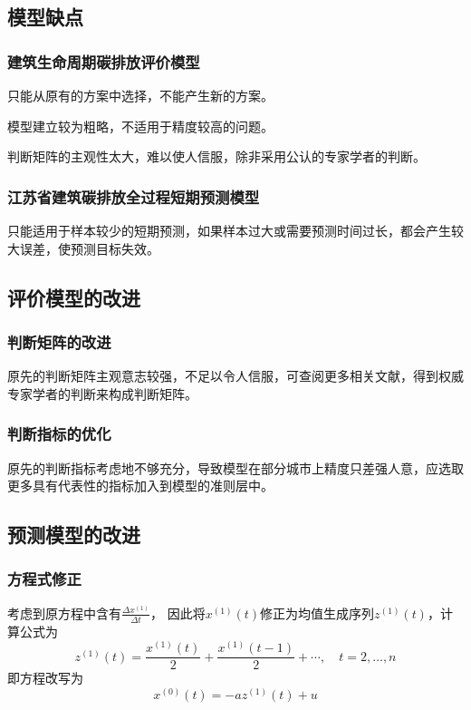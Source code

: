 \documentclass[a4paper, 12pt]{article}
\numberwithin{equation}{section}
\begin{document}
        \subsection{模型缺点}
            \subsubsection{建筑生命周期碳排放评价模型}
                只能从原有的方案中选择，不能产生新的方案。

                模型建立较为粗略，不适用于精度较高的问题。

                判断矩阵的主观性太大，难以使人信服，除非采用公认的专家学者的判断。

            \subsubsection{江苏省建筑碳排放全过程短期预测模型}
                只能适用于样本较少的短期预测，如果样本过大或需要预测时间过长，都会产生较大误差，使预测目标失效。


    {}
        \subsection{评价模型的改进}
            \subsubsection{判断矩阵的改进}
                原先的判断矩阵主观意志较强，不足以令人信服，可查阅更多相关文献，得到权威专家学者的判断来构成判断矩阵。

            \subsubsection{判断指标的优化}
                原先的判断指标考虑地不够充分，导致模型在部分城市上精度只差强人意，应选取更多具有代表性的指标加入到模型的准则层中。


        \subsection{预测模型的改进}
            \subsubsection{方程式修正}
                考虑到原方程中含有$ \frac{\Delta x^{ (1)}}{\Delta t} $，
                因此将$ x^{ (1)} (t) $修正为均值生成序列$ z^{ (1)} (t) $，计算公式为
                \[ z^{ (1)} (t) = \frac{x^{ (1)} (t)}{2} + \frac{x^{ (1)} (t - 1)}{2} + \cdots, \quad t = 2, \ldots, n \]
                即方程改写为
                \[ x^{ (0)} (t) = -az^{ (1)} (t) + u \]
\end{document}
